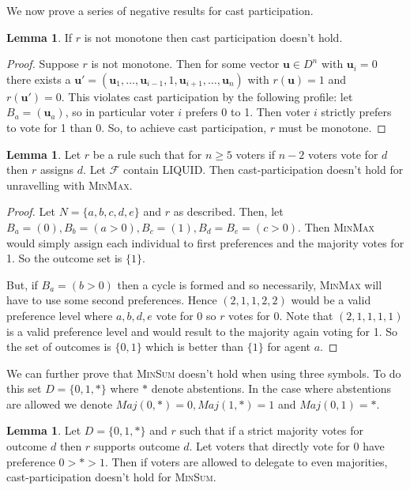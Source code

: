 \documentclass[11pt,a4paper, titlepage]{article}
\theoremstyle{definition}
\newtheorem{lemma}[theorem]{Lemma}
\let\vec\mathbf
\begin{document}
We now prove a series of negative results for cast participation.

\begin{lemma} If $r$ is not monotone then cast participation doesn't hold.
\end{lemma}

\begin{proof}
    Suppose $r$ is not monotone. Then for some vector $\vec{u} \in D^n$ with $\vec{u}_i = 0$ there exists a $\vec{u}' = (\vec{u}_1, \ldots, \vec{u}_{i-1}, 1, \vec{u}_{i+1}, \ldots, \vec{u}_n )$ with $r(\vec{u}) = 1$ and $r(\vec{u}') = 0$. This violates cast participation by the following profile: let $B_a = (\vec{u}_a)$, so in particular voter $i$ prefers 0 to 1. Then voter $i$ strictly prefers to vote for 1 than 0. So, to achieve cast participation, $r$ must be monotone.
\end{proof}

\begin{lemma}
    Let $r$ be a rule such that for $n \geq 5$ voters if $n-2$ voters vote for $d$ then $r$ assigns $d$. Let $\mathcal{F}$ contain LIQUID. Then cast-participation doesn't hold for unravelling with \textsc{MinMax}.
\end{lemma}

\begin{proof}
    Let $N = \{a, b, c, d, e\}$ and $r$ as described. Then, let $B_a = (0), B_b = (a > 0), B_c = (1), B_d = B_e = (c > 0)$. Then \textsc{MinMax} would simply assign each individual to first preferences and the majority votes for 1. So the outcome set is $\{1\}$.

    But, if $B_a = (b > 0)$ then a cycle is formed and so necessarily, \textsc{MinMax} will have to use some second preferences. Hence $(2, 1, 1, 2, 2)$ would be a valid preference level where $a, b, d, e$ vote for $0$ so $r$ votes for $0$. Note that $(2, 1, 1, 1, 1)$ is a valid preference level and would result to the majority again voting for 1. So the set of outcomes is $\{0, 1\}$ which is better than $\{1\}$ for agent $a$.
\end{proof}

We can further prove that \textsc{MinSum} doesn't hold when using three symbols. To do this set $D = \{0, 1, *\}$ where $*$ denote abstentions.
In the case where abstentions are allowed we denote $\mathit{Maj}(0, *) = 0, \mathit{Maj}(1, *) = 1$ and $\mathit{Maj}(0, 1) = *$.

\begin{lemma}
    Let $D = \{0, 1, *\}$ and $r$ such that if a strict majority votes for outcome $d$ then $r$ supports outcome $d$. Let voters that directly vote for $0$ have preference $0 > * > 1$. Then if voters are allowed to delegate to even majorities, cast-participation doesn't hold for \textsc{MinSum}. 
\end{lemma}
\end{document}
